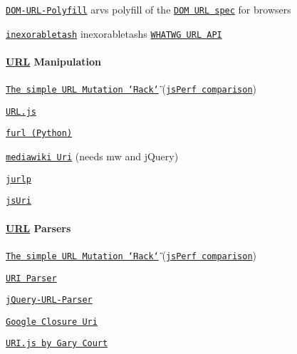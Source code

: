 \begin{DoxyItemize}
\item \href{https://github.com/arv/DOM-URL-Polyfill/}{\tt D\+O\+M-\/\+U\+R\+L-\/\+Polyfill} arv\textquotesingle{}s polyfill of the \href{https://dvcs.w3.org/hg/url/raw-file/tip/Overview.html#interface-urlutils}{\tt D\+OM U\+RL spec} for browsers
\item \href{https://github.com/inexorabletash/polyfill/#whatwg-url-api}{\tt inexorabletash} inexorabletash\textquotesingle{}s \href{http://url.spec.whatwg.org/}{\tt W\+H\+A\+T\+WG U\+RL A\+PI}
\end{DoxyItemize}

\paragraph*{\mbox{\hyperlink{namespace_u_r_l}{U\+RL}} Manipulation}


\begin{DoxyItemize}
\item \href{http://jsfiddle.net/rodneyrehm/KkGUJ/}{\tt The simple  U\+RL Mutation \char`\"{}\+Hack\char`\"{}} (\href{http://jsperf.com/idl-attributes-vs-uri-js}{\tt js\+Perf comparison})
\item \href{https://github.com/ericf/urljs}{\tt U\+R\+L.\+js}
\item \href{https://github.com/gruns/furl}{\tt furl (Python)}
\item \href{https://svn.wikimedia.org/viewvc/mediawiki/trunk/phase3/resources/mediawiki/mediawiki.Uri.js?view=markup}{\tt mediawiki Uri} (needs mw and j\+Query)
\item \href{https://github.com/tombonner/jurlp}{\tt jurlp}
\item \href{https://github.com/derek-watson/jsUri}{\tt js\+Uri}
\end{DoxyItemize}

\paragraph*{\mbox{\hyperlink{namespace_u_r_l}{U\+RL}} Parsers}


\begin{DoxyItemize}
\item \href{http://jsfiddle.net/rodneyrehm/KkGUJ/}{\tt The simple  U\+RL Mutation \char`\"{}\+Hack\char`\"{}} (\href{http://jsperf.com/idl-attributes-vs-uri-js}{\tt js\+Perf comparison})
\item \href{http://blog.stevenlevithan.com/archives/parseuri}{\tt U\+RI Parser}
\item \href{https://github.com/allmarkedup/jQuery-URL-Parser}{\tt j\+Query-\/\+U\+R\+L-\/\+Parser}
\item \href{https://google.github.io/closure-library/api/class_goog_Uri.html}{\tt Google Closure Uri}
\item \href{https://github.com/garycourt/uri-js}{\tt U\+R\+I.\+js by Gary Court}
\end{DoxyItemize}

